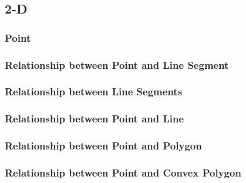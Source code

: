 \subsection{2-D} %

\subsubsection{Point} %


\subsubsection{Relationship between Point and Line Segment} %


\subsubsection{Relationship between Line Segments} %


\subsubsection{Relationship between Point and Line} %


\subsubsection{Relationship between Point and Polygon} %


\subsubsection{Relationship between Point and Convex Polygon} %


